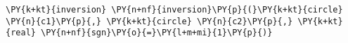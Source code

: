 \begin{Verbatim}[commandchars=\\\{\}]
    \PY{k+kt}{inversion} \PY{n+nf}{inversion}\PY{p}{(}\PY{k+kt}{circle} \PY{n}{c1}\PY{p}{,} \PY{k+kt}{circle} \PY{n}{c2}\PY{p}{,} \PY{k+kt}{real} \PY{n+nf}{sgn}\PY{o}{=}\PY{l+m+mi}{1}\PY{p}{)}
\end{Verbatim}
